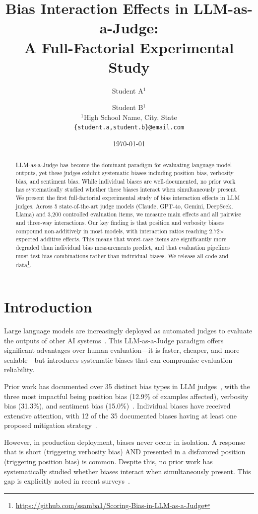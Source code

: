 \documentclass[11pt,twocolumn]{article}
\title{Bias Interaction Effects in LLM-as-a-Judge:\\A Full-Factorial Experimental Study}
\author{Student A$^{1}$ \and Student B$^{1}$ \\
$^{1}$High School Name, City, State \\
\texttt{\{student.a,student.b\}@email.com}
}
\date{\today}
\begin{document}
\maketitle

\begin{abstract}
LLM-as-a-Judge has become the dominant paradigm for evaluating language model outputs, yet these judges exhibit systematic biases including position bias, verbosity bias, and sentiment bias. While individual biases are well-documented, no prior work has systematically studied whether these biases interact when simultaneously present. We present the first full-factorial experimental study of bias interaction effects in LLM judges. Across 5 state-of-the-art judge models (Claude, GPT-4o, Gemini, DeepSeek, Llama) and 3,200 controlled evaluation items, we measure main effects and all pairwise and three-way interactions. Our key finding is that position and verbosity biases compound non-additively in most models, with interaction ratios reaching 2.72$\times$ expected additive effects. This means that worst-case items are significantly more degraded than individual bias measurements predict, and that evaluation pipelines must test bias combinations rather than individual biases. We release all code and data\footnote{\url{https://github.com/ssamba1/Scoring-Bias-in-LLM-as-a-Judge}}.
\end{abstract}

\section{Introduction}
\label{sec:introduction}

Large language models are increasingly deployed as automated judges to evaluate the outputs of other AI systems~\citep{zheng2023judging,gu2024survey}. This LLM-as-a-Judge paradigm offers significant advantages over human evaluation---it is faster, cheaper, and more scalable---but introduces systematic biases that can compromise evaluation reliability.

Prior work has documented over 35 distinct bias types in LLM judges~\citep{ye2024justice,park2024offsetbias,li2025scoring}, with the three most impactful being position bias (12.9\% of examples affected), verbosity bias (31.3\%), and sentiment bias (15.0\%)~\citep{yang2025reliable}. Individual biases have received extensive attention, with 12 of the 35 documented biases having at least one proposed mitigation strategy~\citep{soumik2026judging}.

However, in production deployment, biases never occur in isolation. A response that is short (triggering verbosity bias) AND presented in a disfavored position (triggering position bias) is common. Despite this, no prior work has systematically studied whether biases interact when simultaneously present. This gap is explicitly noted in recent surveys~\citep{soumik2026judging,gu2024survey,li2025scoring}.
\end{document}
